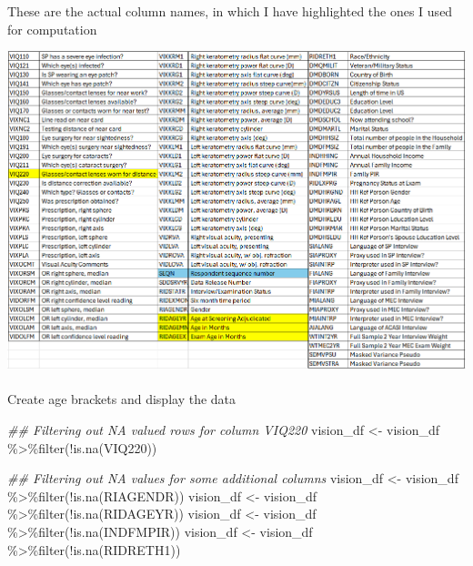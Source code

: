 \documentclass[
  12pt,
]{article}
\makeatletter
\let\oldparagraph\paragraph
\renewcommand{\paragraph}{
    \@ifstar
      \xxxParagraphStar
      \xxxParagraphNoStar
  }
\newcommand{\xxxParagraphStar}[1]{\oldparagraph*{#1}\mbox{}}
\newcommand{\xxxParagraphNoStar}[1]{\oldparagraph{#1}\mbox{}}
\newenvironment{Shaded}{\begin{snugshade}}{\end{snugshade}}
\newcommand{\DocumentationTok}[1]{\textcolor[rgb]{0.37,0.37,0.37}{\textit{#1}}}
\newcommand{\FunctionTok}[1]{\textcolor[rgb]{0.28,0.35,0.67}{#1}}
\newcommand{\NormalTok}[1]{\textcolor[rgb]{0.00,0.23,0.31}{#1}}
\newcommand{\OtherTok}[1]{\textcolor[rgb]{0.00,0.23,0.31}{#1}}
\newcommand{\SpecialCharTok}[1]{\textcolor[rgb]{0.37,0.37,0.37}{#1}}
\makeatother
\begin{document}
These are the actual column names, in which I have highlighted the ones
I used for computation

\includegraphics{images/clipboard-1760357132.png}

\paragraph{Create age brackets and display the
data}\label{create-age-brackets-and-display-the-data}

\begin{Shaded}
\begin{Highlighting}[]
\DocumentationTok{\#\# Filtering out NA valued rows for column VIQ220}
\NormalTok{vision\_df }\OtherTok{\textless{}{-}}\NormalTok{ vision\_df }\SpecialCharTok{\%\textgreater{}\%}\FunctionTok{filter}\NormalTok{(}\SpecialCharTok{!}\FunctionTok{is.na}\NormalTok{(VIQ220))}

\DocumentationTok{\#\# Filtering out NA values for some additional columns }
\NormalTok{vision\_df }\OtherTok{\textless{}{-}}\NormalTok{ vision\_df }\SpecialCharTok{\%\textgreater{}\%}\FunctionTok{filter}\NormalTok{(}\SpecialCharTok{!}\FunctionTok{is.na}\NormalTok{(RIAGENDR))}
\NormalTok{vision\_df }\OtherTok{\textless{}{-}}\NormalTok{ vision\_df }\SpecialCharTok{\%\textgreater{}\%}\FunctionTok{filter}\NormalTok{(}\SpecialCharTok{!}\FunctionTok{is.na}\NormalTok{(RIDAGEYR))}
\NormalTok{vision\_df }\OtherTok{\textless{}{-}}\NormalTok{ vision\_df }\SpecialCharTok{\%\textgreater{}\%}\FunctionTok{filter}\NormalTok{(}\SpecialCharTok{!}\FunctionTok{is.na}\NormalTok{(INDFMPIR))}
\NormalTok{vision\_df }\OtherTok{\textless{}{-}}\NormalTok{ vision\_df }\SpecialCharTok{\%\textgreater{}\%}\FunctionTok{filter}\NormalTok{(}\SpecialCharTok{!}\FunctionTok{is.na}\NormalTok{(RIDRETH1))}
\end{Highlighting}
\end{Shaded}
\end{document}
